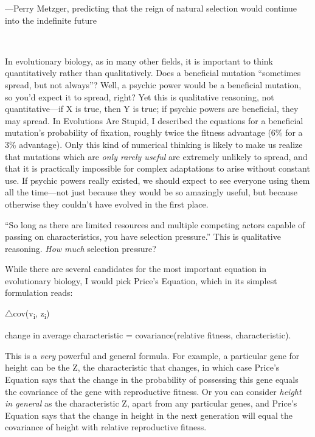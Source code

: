 {\raggedleft
 {}---Perry Metzger, predicting that the reign of natural selection
would continue into the indefinite future
\par}


\bigskip

{
 ~}

{
 In evolutionary biology, as in many other fields, it is important
to think quantitatively rather than qualitatively. Does a beneficial
mutation ``sometimes spread, but not
always''? Well, a psychic power would be a beneficial
mutation, so you'd expect it to spread, right? Yet this
is qualitative reasoning, not quantitative---if X is true, then Y is
true; if psychic powers are beneficial, they may spread. In Evolutions
Are Stupid, I described the equations for a beneficial
mutation's probability of fixation, roughly twice the
fitness advantage (6\% for a 3\% advantage). Only this kind of
numerical thinking is likely to make us realize that mutations which
are \textit{only rarely useful} are extremely unlikely to spread, and
that it is practically impossible for complex adaptations to arise
without constant use. If psychic powers really existed, we should
expect to see everyone using them all the time---not just because they
would be so amazingly useful, but because otherwise they
couldn't have evolved in the first place.}

{
 ``So long as there are limited resources and
multiple competing actors capable of passing on characteristics, you
have selection pressure.'' This is qualitative
reasoning. \textit{How much} selection pressure?}

{
 While there are several candidates for the most important equation
in evolutionary biology, I would pick Price's Equation,
which in its simplest formulation reads:}

{\centering
 ${\triangle}$cov(v\textsubscript{i}, z\textsubscript{i})
\par}


\bigskip

{\centering
 change in average characteristic = covariance(relative fitness,
characteristic).
\par}


\bigskip

{
 This is a \textit{very} powerful and general formula. For example,
a particular gene for height can be the Z, the characteristic that
changes, in which case Price's Equation says that the
change in the probability of possessing this gene equals the covariance
of the gene with reproductive fitness. Or you can consider
\textit{height in general} as the characteristic Z, apart from any
particular genes, and Price's Equation says that the
change in height in the next generation will equal the covariance of
height with relative reproductive fitness. }

